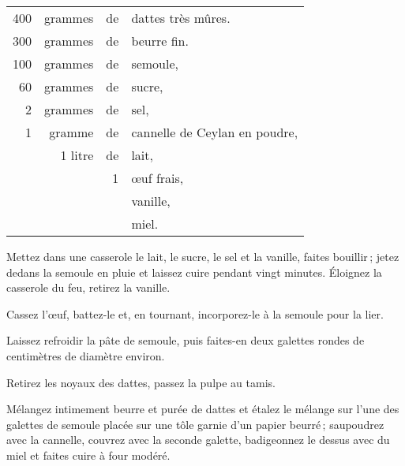\footnotesize
\begin{longtable}{rrrp{16em}}
    400 & grammes & de & dattes très mûres.                                                               \\
    300 & grammes & de & beurre fin.                                                                      \\
    100 & grammes & de & semoule,                                                                         \\
     60 & grammes & de & sucre,                                                                           \\
      2 & grammes & de & sel,                                                                             \\
      1 & gramme  & de & cannelle de Ceylan en poudre,                                                    \\
        & 1 litre & de & lait,                                                                            \\
        &         &  1 & œuf frais,                                                                       \\
        &         &    & vanille,                                                                         \\
        &         &    & miel.                                                                            \\
\end{longtable}
\normalsize

Mettez dans une casserole le lait, le sucre, le sel et la vanille, faites
bouillir ; jetez dedans la semoule en pluie et laissez cuire pendant vingt
minutes. Éloignez la casserole du feu, retirez la vanille.

Cassez l'œuf, battez-le et, en tournant, incorporez-le à la semoule pour la
lier.

Laissez refroidir la pâte de semoule, puis faites-en deux galettes rondes de
{\mmm} centimètres de diamètre environ.

Retirez les noyaux des dattes, passez la pulpe au tamis.

Mélangez intimement beurre et purée de dattes et étalez le mélange sur l'une
des galettes de semoule placée sur une tôle garnie d'un papier beurré ;
saupoudrez avec la cannelle, couvrez avec la seconde galette, badigeonnez le
dessus avec du miel et faites cuire à four modéré.

